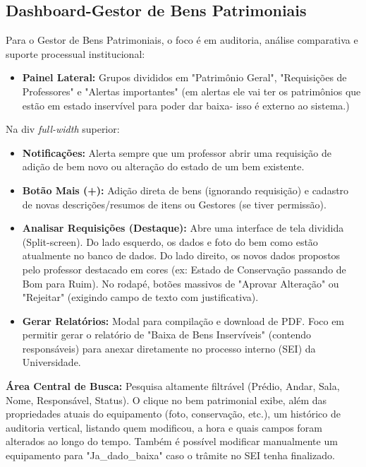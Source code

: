 \documentclass[12pt,a4paper]{article}
\begin{document}
\subsection{Dashboard-Gestor de Bens Patrimoniais}
Para o Gestor de Bens Patrimoniais, o foco é em auditoria, análise comparativa e suporte processual institucional:
\begin{itemize}
    \item \textbf{Painel Lateral:} Grupos divididos em "Patrimônio Geral", "Requisições de Professores" e "Alertas importantes" (em alertas ele vai ter os patrimônios que estão em estado inservível para poder dar baixa- isso é externo ao sistema.)
\end{itemize}
Na div \textit{full-width} superior:
\begin{itemize}
    \item \textbf{Notificações:} Alerta sempre que um professor abrir uma requisição de adição de bem novo ou alteração do estado de um bem existente.
    \item \textbf{Botão Mais (+):} Adição direta de bens (ignorando requisição) e cadastro de novas descrições/resumos de itens ou Gestores (se tiver permissão).
    \item \textbf{Analisar Requisições (Destaque):} Abre uma interface de tela dividida (Split-screen). Do lado esquerdo, os dados e foto do bem como estão atualmente no banco de dados. Do lado direito, os novos dados propostos pelo professor destacado em cores (ex: Estado de Conservação passando de Bom para Ruim). No rodapé, botões massivos de "Aprovar Alteração" ou "Rejeitar" (exigindo campo de texto com justificativa).
    \item \textbf{Gerar Relatórios:} Modal para compilação e download de PDF. Foco em permitir gerar o relatório de "Baixa de Bens Inservíveis" (contendo responsáveis) para anexar diretamente no processo interno (SEI) da Universidade.
\end{itemize}
\textbf{Área Central de Busca:} Pesquisa altamente filtrável (Prédio, Andar, Sala, Nome, Responsável, Status). O clique no bem patrimonial exibe, além das propriedades atuais do equipamento (foto, conservação, etc.), um histórico de auditoria vertical, listando quem modificou, a hora e quais campos foram alterados ao longo do tempo. Também é possível modificar manualmente um equipamento para "Ja\_dado\_baixa" caso o trâmite no SEI tenha finalizado.
\end{document}

